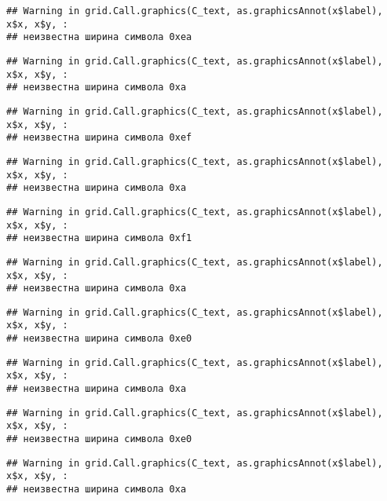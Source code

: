 \documentclass[
]{article}
\begin{document}
\begin{verbatim}
## Warning in grid.Call.graphics(C_text, as.graphicsAnnot(x$label), x$x, x$y, :
## неизвестна ширина символа 0xea
\end{verbatim}

\begin{verbatim}
## Warning in grid.Call.graphics(C_text, as.graphicsAnnot(x$label), x$x, x$y, :
## неизвестна ширина символа 0xa
\end{verbatim}

\begin{verbatim}
## Warning in grid.Call.graphics(C_text, as.graphicsAnnot(x$label), x$x, x$y, :
## неизвестна ширина символа 0xef
\end{verbatim}

\begin{verbatim}
## Warning in grid.Call.graphics(C_text, as.graphicsAnnot(x$label), x$x, x$y, :
## неизвестна ширина символа 0xa
\end{verbatim}

\begin{verbatim}
## Warning in grid.Call.graphics(C_text, as.graphicsAnnot(x$label), x$x, x$y, :
## неизвестна ширина символа 0xf1
\end{verbatim}

\begin{verbatim}
## Warning in grid.Call.graphics(C_text, as.graphicsAnnot(x$label), x$x, x$y, :
## неизвестна ширина символа 0xa
\end{verbatim}

\begin{verbatim}
## Warning in grid.Call.graphics(C_text, as.graphicsAnnot(x$label), x$x, x$y, :
## неизвестна ширина символа 0xe0
\end{verbatim}

\begin{verbatim}
## Warning in grid.Call.graphics(C_text, as.graphicsAnnot(x$label), x$x, x$y, :
## неизвестна ширина символа 0xa
\end{verbatim}

\begin{verbatim}
## Warning in grid.Call.graphics(C_text, as.graphicsAnnot(x$label), x$x, x$y, :
## неизвестна ширина символа 0xe0
\end{verbatim}

\begin{verbatim}
## Warning in grid.Call.graphics(C_text, as.graphicsAnnot(x$label), x$x, x$y, :
## неизвестна ширина символа 0xa
\end{verbatim}
\end{document}

